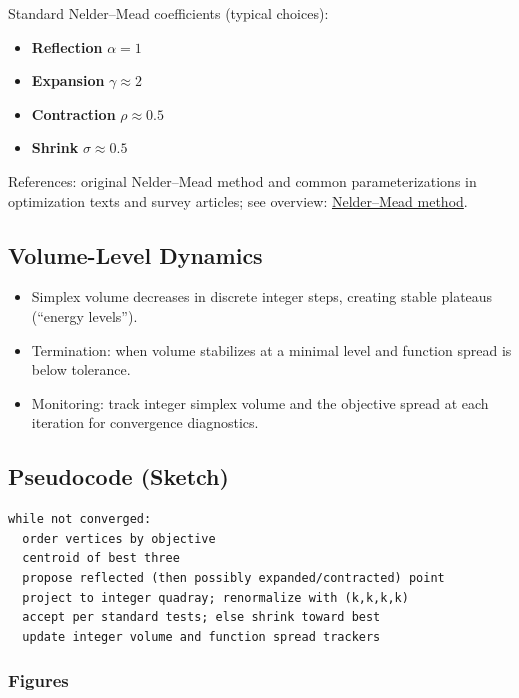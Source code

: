 \documentclass[
  10pt,
]{article}
\providecommand{\tightlist}{%
  \setlength{\itemsep}{0pt}\setlength{\parskip}{0pt}}
\begin{document}
Standard Nelder--Mead coefficients (typical choices):

\begin{itemize}
\tightlist
\item
  \textbf{Reflection} \(\alpha = 1\)
\item
  \textbf{Expansion} \(\gamma \approx 2\)
\item
  \textbf{Contraction} \(\rho \approx 0.5\)
\item
  \textbf{Shrink} \(\sigma \approx 0.5\)
\end{itemize}

References: original Nelder--Mead method and common parameterizations in
optimization texts and survey articles; see overview:
\href{https://en.wikipedia.org/wiki/Nelder\%E2\%80\%93Mead_method}{Nelder--Mead
method}.

\hypertarget{volume-level-dynamics}{%
\subsection{Volume-Level Dynamics}\label{volume-level-dynamics}}

\begin{itemize}
\tightlist
\item
  Simplex volume decreases in discrete integer steps, creating stable
  plateaus (``energy levels'').
\item
  Termination: when volume stabilizes at a minimal level and function
  spread is below tolerance.
\item
  Monitoring: track integer simplex volume and the objective spread at
  each iteration for convergence diagnostics.
\end{itemize}

\hypertarget{pseudocode-sketch}{%
\subsection{Pseudocode (Sketch)}\label{pseudocode-sketch}}

\begin{verbatim}
while not converged:
  order vertices by objective
  centroid of best three
  propose reflected (then possibly expanded/contracted) point
  project to integer quadray; renormalize with (k,k,k,k)
  accept per standard tests; else shrink toward best
  update integer volume and function spread trackers
\end{verbatim}

\hypertarget{figures-1}{%
\subsubsection{Figures}\label{figures-1}}
\end{document}

